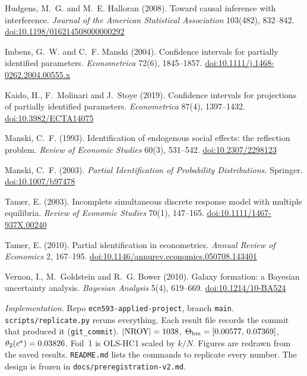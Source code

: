 \documentclass[11pt]{article}
\newcommand{\NROY}{\mathrm{NROY}}
\newcommand{\hm}{\mathrm{hm}}
\begin{document}
{\noindent Hudgens, M.~G. and M.~E. Halloran (2008). Toward causal inference with interference. \textit{Journal of the American Statistical Association} 103(482), 832--842. \href{https://doi.org/10.1198/016214508000000292}{doi:10.1198/016214508000000292}

\noindent Imbens, G.~W. and C.~F. Manski (2004). Confidence intervals for partially identified parameters. \textit{Econometrica} 72(6), 1845--1857. \href{https://doi.org/10.1111/j.1468-0262.2004.00555.x}{doi:10.1111/j.1468-0262.2004.00555.x}

\noindent Kaido, H., F.~Molinari and J.~Stoye (2019). Confidence intervals for projections of partially identified parameters. \textit{Econometrica} 87(4), 1397--1432. \href{https://doi.org/10.3982/ECTA14075}{doi:10.3982/ECTA14075}

\noindent Manski, C.~F. (1993). Identification of endogenous social effects: the reflection problem. \textit{Review of Economic Studies} 60(3), 531--542. \href{https://doi.org/10.2307/2298123}{doi:10.2307/2298123}

\noindent Manski, C.~F. (2003). \textit{Partial Identification of Probability Distributions.} Springer. \href{https://doi.org/10.1007/b97478}{doi:10.1007/b97478}

\noindent Tamer, E. (2003). Incomplete simultaneous discrete response model with multiple equilibria. \textit{Review of Economic Studies} 70(1), 147--165. \href{https://doi.org/10.1111/1467-937X.00240}{doi:10.1111/1467-937X.00240}

\noindent Tamer, E. (2010). Partial identification in econometrics. \textit{Annual Review of Economics} 2, 167--195. \href{https://doi.org/10.1146/annurev.economics.050708.143401}{doi:10.1146/annurev.economics.050708.143401}

\noindent Vernon, I., M.~Goldstein and R.~G. Bower (2010). Galaxy formation: a Bayesian uncertainty analysis. \textit{Bayesian Analysis} 5(4), 619--669. \href{https://doi.org/10.1214/10-BA524}{doi:10.1214/10-BA524}
}

\vspace{1.2em}
{\small
\noindent\textit{Implementation.}
Repo \texttt{ecn593-applied-project}, branch \texttt{main}.
\texttt{scripts/replicate.py} reruns everything. Each result file records
the commit that produced it (\texttt{git\_commit}).
$|\NROY|=\NNroy$,
$\Theta_{\hm}=[\ThetaHmLo,\,\ThetaHmHi]$,
$\theta_2(c^\star)=0.03826$.
Foil~1 is OLS-HC1 scaled by $k/N$.
Figures are redrawn from the saved results.
\texttt{README.md} lists the commands to replicate every number. The design is
frozen in \texttt{docs/preregistration-v2.md}.
}
\end{document}
